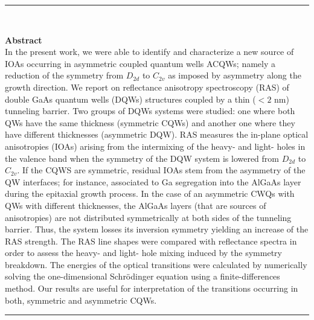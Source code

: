 \cleardoublepage
\vspace{-5cm}
\begin{vcentrepage}
	\noindent\rule[2pt]{\textwidth}{0.8pt}\\
	\begin{center}
		{\Large\textbf{}}
	\end{center}
	{\large\textbf{Abstract}}\\
	In the present work, we were able to identify and characterize a new source of IOAs occurring in asymmetric coupled quantum wells ACQWs; namely a reduction of the symmetry from $D_{2d}$ to $C_{2v}$ as imposed by asymmetry along the growth direction.
	We report  on reflectance anisotropy spectroscopy (RAS) of  double GaAs quantum wells (DQWs)  structures coupled by a thin ($<2$ nm) tunneling  barrier. Two groups of DQWs systems were studied: one where both QWs have the same thickness (symmetric CQWs) and another one where they have different thicknesses (asymmetric DQW). RAS measures the in-plane optical anisotropies (IOAs) arising from the intermixing of the heavy- and light- holes in the valence band when the symmetry of the DQW system is lowered from $D_{2d}$ to $C_{2v}$. If the CQWS are symmetric, residual IOAs stem from the asymmetry of the QW  interfaces; for instance, associated to Ga segregation into the AlGaAs layer during the epitaxial growth process. In the case of an asymmetric CWQs with QWs with different thicknesses, the AlGaAs layers (that are sources of anisotropies) are not distributed symmetrically at both sides of the tunneling barrier. Thus, the system losses its inversion symmetry  yielding an increase of the RAS strength. The RAS line shapes were compared with reflectance spectra in order to assess the heavy- and light- hole mixing induced by the  symmetry breakdown. The energies of the optical transitions were calculated by numerically solving the one-dimensional Schrödinger equation using a finite-differences method. Our results are useful for interpretation of the transitions occurring in both, symmetric and asymmetric CQWs.
	
	\noindent\rule[2pt]{\textwidth}{0.8pt}
\end{vcentrepage}


%
